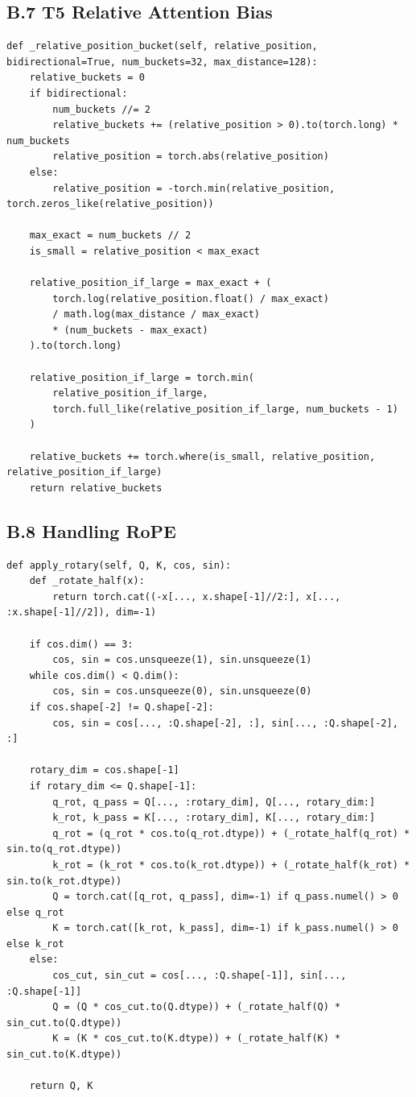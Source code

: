 \subsection{B.7 T5 Relative Attention Bias}

\begin{lstlisting}
def _relative_position_bucket(self, relative_position, bidirectional=True, num_buckets=32, max_distance=128):
    relative_buckets = 0
    if bidirectional:
        num_buckets //= 2
        relative_buckets += (relative_position > 0).to(torch.long) * num_buckets
        relative_position = torch.abs(relative_position)
    else:
        relative_position = -torch.min(relative_position, torch.zeros_like(relative_position))
    
    max_exact = num_buckets // 2
    is_small = relative_position < max_exact
    
    relative_position_if_large = max_exact + (
        torch.log(relative_position.float() / max_exact)
        / math.log(max_distance / max_exact)
        * (num_buckets - max_exact)
    ).to(torch.long)
    
    relative_position_if_large = torch.min(
        relative_position_if_large,
        torch.full_like(relative_position_if_large, num_buckets - 1)
    )
    
    relative_buckets += torch.where(is_small, relative_position, relative_position_if_large)
    return relative_buckets
\end{lstlisting}

\subsection{B.8 Handling RoPE}

\begin{lstlisting}
def apply_rotary(self, Q, K, cos, sin):
    def _rotate_half(x):
        return torch.cat((-x[..., x.shape[-1]//2:], x[..., :x.shape[-1]//2]), dim=-1)
    
    if cos.dim() == 3:
        cos, sin = cos.unsqueeze(1), sin.unsqueeze(1)
    while cos.dim() < Q.dim():
        cos, sin = cos.unsqueeze(0), sin.unsqueeze(0)
    if cos.shape[-2] != Q.shape[-2]:
        cos, sin = cos[..., :Q.shape[-2], :], sin[..., :Q.shape[-2], :]
    
    rotary_dim = cos.shape[-1]
    if rotary_dim <= Q.shape[-1]:
        q_rot, q_pass = Q[..., :rotary_dim], Q[..., rotary_dim:]
        k_rot, k_pass = K[..., :rotary_dim], K[..., rotary_dim:]
        q_rot = (q_rot * cos.to(q_rot.dtype)) + (_rotate_half(q_rot) * sin.to(q_rot.dtype))
        k_rot = (k_rot * cos.to(k_rot.dtype)) + (_rotate_half(k_rot) * sin.to(k_rot.dtype))
        Q = torch.cat([q_rot, q_pass], dim=-1) if q_pass.numel() > 0 else q_rot
        K = torch.cat([k_rot, k_pass], dim=-1) if k_pass.numel() > 0 else k_rot
    else:
        cos_cut, sin_cut = cos[..., :Q.shape[-1]], sin[..., :Q.shape[-1]]
        Q = (Q * cos_cut.to(Q.dtype)) + (_rotate_half(Q) * sin_cut.to(Q.dtype))
        K = (K * cos_cut.to(K.dtype)) + (_rotate_half(K) * sin_cut.to(K.dtype))
    
    return Q, K
\end{lstlisting}

